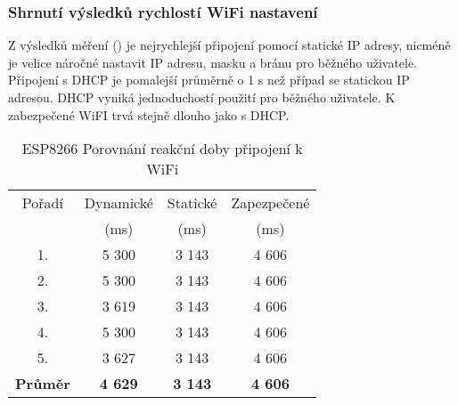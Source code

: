 \documentclass[a4paper, 12pt]{report}
\begin{document}
				\subsubsection{Shrnutí výsledků rychlostí WiFi nastavení}
					Z výsledků měření () je nejrychlejší připojení pomocí statické IP adresy, nicméně je velice náročné nastavit IP adresu, masku a bránu pro běžného uživatele. Připojení s DHCP je pomalejší průměrně o 1 \si{s} než případ se statickou IP adresou. DHCP vyniká jednoduchostí použití pro běžného uživatele. K zabezpečené WiFI trvá stejně dlouho jako s DHCP.

					\begin{table}[]
						\centering
						\caption{ESP8266 Porovnání reakční doby připojení k WiFi}
						\begin{tabular}{||c|c c c||}
							\hline
							Pořadí & Dynamické & Statické & Zapezpečené\\
							& (ms) & (ms) & (ms)\\
							\hline

							1. & 5 300 & 3 143 & 4 606\\
							2. & 5 300 & 3 143 & 4 606\\
							3. & 3 619 & 3 143 & 4 606\\
							4. & 5 300 & 3 143 & 4 606\\
							5. & 3 627 & 3 143 & 4 606\\
							\hline
							{\bf Průměr} & {\bf 4 629} & {\bf 3 143} & {\bf 4 606}\\
							\hline

						\end{tabular}
						\label{WiFi porovnání v sekundách}
					\end{table}
\end{document}
